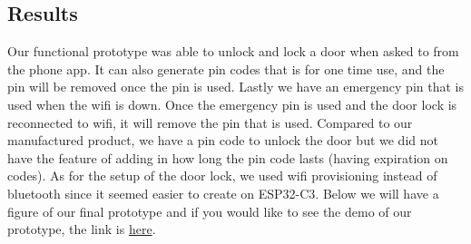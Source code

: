 \subsection{Results}

Our functional prototype was able to unlock and lock a door when asked to from the phone app. It can also generate pin codes that is for one time use, and the pin will be removed once the pin is used. Lastly we have an emergency pin that is used when the wifi is down. Once the emergency pin is used and the door lock is reconnected to wifi, it will remove the pin that is used. Compared to our manufactured product, we have a pin code to unlock the door but we did not have the feature of adding in how long the pin code lasts (having expiration on codes). As for the setup of the door lock, we used wifi provisioning instead of bluetooth since it seemed easier to create on ESP32-C3. Below we will have a figure of our final prototype and if you would like to see the demo of our prototype, the link is \href{https://youtu.be/XbD7zrFxasE?si=83Vg6o0KJSXbOtdF}{here}.

